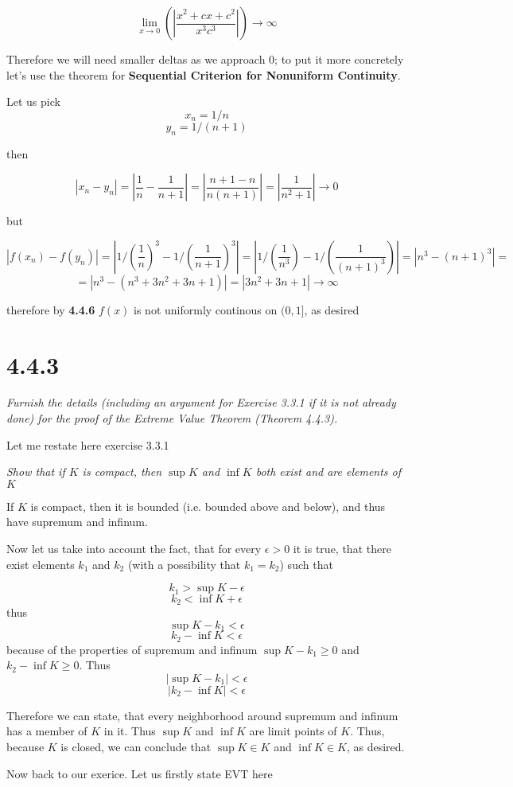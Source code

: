 \documentclass[11pt,oneside,titlepage]{book}
\begin{document}
$$ \lim_{x \to 0}(|\frac{x^2 + cx + c^2}{x^3c^3}|) \to \infty  $$

Therefore we will need smaller deltas as we approach 0; to put it more
concretely let's use the theorem for
\textbf{Sequential Criterion for Nonuniform Continuity}.

Let us pick
$$x_n = 1/n$$
$$y_n = 1/(n + 1)$$

then

$$|x_n - y_n| = |\frac{1}{n} - \frac{1}{n + 1}| = |\frac{n + 1 - n}{n(n + 1)}|
= |\frac{1}{n ^ 2 + 1}| \to 0$$

but

$$ |f(x_n) - f(y_n)| = |1/(\frac{1}{n})^3 - 1/(\frac{1}{n + 1})^3| = |1/(\frac{1}{n^3}) - 1/(\frac{1}{(n + 1)^3})| =  |n^3 - (n + 1)^3| =  $$
$$ = |n^3 - (n ^ 3 + 3 n^2 + 3 n + 1)| = |3n^2 + 3n + 1| \to \infty$$

therefore by \textbf{4.4.6} $f(x)$ is not uniformly continous on $(0, 1]$, as desired

\section*{4.4.3}
\textit{Furnish the details (including an argument for Exercise 3.3.1 if it is not already done) for the proof of the Extreme Value Theorem (Theorem 4.4.3).}

Let me restate here exercise 3.3.1

\textit{Show that if $K$ is compact, then $\sup K$ and $\inf K$ both exist
  and are elements of $K$}

If $K$ is compact, then it is bounded (i.e. bounded above and below), and
thus have supremum and infinum.

Now let us take into account the fact, that for every $\epsilon > 0$ it is
true, that there exist elements $k_1$ and $k_2$ (with a possibility
that $k_1 = k_2$) such that

$$k_1 > \sup K - \epsilon$$
$$k_2 < \inf K + \epsilon$$
thus
$$\sup K - k_1 <  \epsilon$$
$$k_2 - \inf K < \epsilon$$
because of the properties of supremum and infinum $\sup K - k_1 \geq  0$ and
$k_2 - \inf K \geq 0$. Thus
$$|\sup K - k_1| < \epsilon$$
$$|k_2 - \inf K| < \epsilon$$

Therefore we can state, that every neighborhood around supremum and infinum
has a member of $K$ in it. Thus $\sup K$ and $\inf  K$ are limit points of $K$.
Thus, because $K$ is closed, we can conclude that $\sup K \in K$ and
$\inf K \in K$, as desired.

Now back to our exerice. Let us firstly state EVT here
\end{document}
